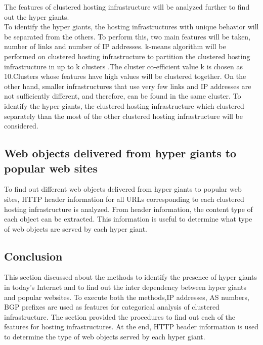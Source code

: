 \noindent The features of clustered hosting infrastructure will be analyzed further to find out the hyper giants.\\

\noindent To identify the hyper giants, the hosting infrastructures with unique behavior will be separated from the others. To perform this, two main features will be taken, number of links and number of IP addresses. k-means algorithm will be performed on clustered hosting infrastructure to partition the clustered hosting infrastructure in up to k clusters .The cluster co-efficient value k is chosen as 10.Clusters whose features have high values will be clustered together. On the other hand, smaller infrastructures that use very few links and IP addresses are not sufficiently different, and therefore, can be found in the same cluster. To identify the hyper giants, the clustered hosting infrastructure which clustered separately than the most of the other clustered hosting infrastructure will be considered.\\

\subsection{Web objects delivered from hyper giants to popular web sites}
\noindent To find out different web objects delivered from hyper giants to popular web sites, HTTP header information for all URLs corresponding to each clustered hosting infrastructure is analyzed. From header information, the content type of each object can be extracted. This information is useful to determine what type of web objects are served by each hyper giant.\\
\subsection{Conclusion}
\noindent This section discussed about the methods to identify the presence of hyper giants in today's Internet and to find out the inter dependency between hyper giants and popular websites. To execute both the methods,IP addresses, AS numbers, BGP prefixes are used as features for categorical analysis of clustered infrastructure. The section provided the procedures to find out each of the features for hosting infrastructures. At the end, HTTP header information is used to determine the type of web objects served by each hyper giant.\\